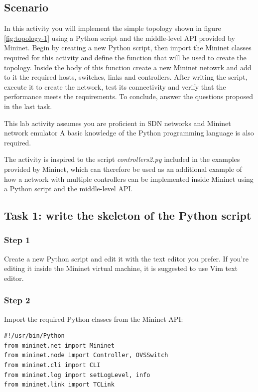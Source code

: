 \subsection*{Scenario}
In this activity you will implement the simple topology shown in figure \ref{fig:topology-1} using
a Python script and the middle-level API provided by Mininet.
Begin by creating a new Python script, then import the Mininet classes required for
this activity and define the function that will be used to create the topology.
Inside the body of this function create a new Mininet netowrk and add to it the
required hosts, switches, links and controllers. After writing the script, execute
it to create the network, test its connectivity and verify that the performance
meets the requirements. To conclude, answer the questions proposed in the last task.

This lab activity assumes you are proficient in SDN networks and Mininet network
emulator %
A basic knowledge of the Python programming language is also required.

The activity is inspired to the script \textit{controllers2.py} \cite{ref-3} included in the
examples provided by Mininet, which can therefore be used as
an additional example of how a network with multiple controllers can be implemented
inside Mininet using a Python script and the middle-level API.




\subsection*{Task 1: write the skeleton of the Python script}
\subsubsection*{Step 1}
Create a new Python script and edit it with the text editor you prefer. If you're editing
it inside the Mininet virtual machine, it is suggested to use Vim text editor.

\subsubsection*{Step 2}
Import the required Python classes from the Mininet API:
\begin{lstlisting}
#!/usr/bin/Python
from mininet.net import Mininet
from mininet.node import Controller, OVSSwitch
from mininet.cli import CLI
from mininet.log import setLogLevel, info
from mininet.link import TCLink
\end{lstlisting}

